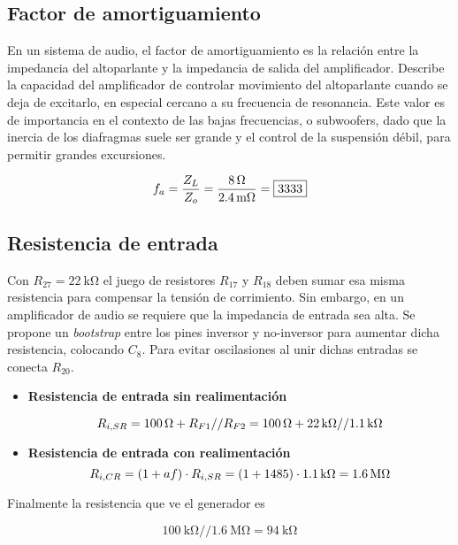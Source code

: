 \subsection{Factor de amortiguamiento}

	En un sistema de audio, el factor de amortiguamiento es la relación entre la impedancia del altoparlante y la impedancia de salida del amplificador. Describe la capacidad del amplificador de controlar movimiento del altoparlante cuando se deja de excitarlo, en especial cercano a su frecuencia de resonancia. Este valor es de importancia en el contexto de las bajas frecuencias, o subwoofers, dado que la inercia de los diafragmas suele ser grande y el control de la suspensión débil, para permitir grandes excursiones.

\begin{equation}
	\centering
	f_a= \frac{Z_L}{Z_o} = \frac{ \SI{8}{\ohm}}{ \SI{2.4}{\milli\ohm}}= \boxed{\num{3333}}
	\label{ec:fa}
\end{equation}



\subsection{Resistencia de entrada}
	
	Con $R_{27}=\SI{22}{\kilo\ohm}$ el juego de resistores $R_{17}$ y $R_{18}$ deben sumar esa misma resistencia para compensar la tensión de corrimiento. Sin embargo, en un amplificador de audio se requiere que la impedancia de entrada sea alta. Se propone un \emph{bootstrap} entre los pines inversor y no-inversor para aumentar dicha resistencia, colocando $C_8$. Para evitar oscilasiones al unir dichas entradas se conecta $R_{20}$.
	

\begin{itemize}
	
		
\item \textbf{Resistencia de entrada sin realimentación}
	
	\begin{equation}
		\centering
		R_{i,SR} = \SI{100}{\ohm} + R_{F1}//R_{F2} = \SI{100}{\ohm} + \SI{22}{\kilo\ohm}//\SI{1.1}{\kilo\ohm}
	\end{equation}
	
\item \textbf{Resistencia de entrada con realimentación}
	\begin{equation}
		\centering
		R_{i,CR} = (1+ af) \cdot R_{i,SR} = (1 + 1485) \cdot \SI{1.1}{\kilo\ohm} = \SI{1.6}{\mega\ohm}
	\end{equation}
	
\end{itemize}

Finalmente la resistencia que ve el generador es

$$ \SI{100}{\kilo\ohm}//\SI{1.6}{\mega\ohm} = \boxed{\SI{94}{\kilo\ohm}} $$



